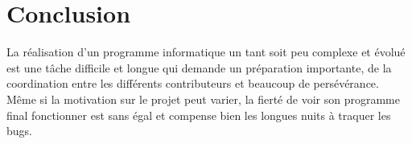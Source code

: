 \section{Conclusion}
La réalisation d'un programme informatique un tant soit peu complexe
et évolué est une tâche difficile et longue qui demande un préparation importante,
de la coordination entre les différents contributeurs et beaucoup de
persévérance. Même si la motivation sur le projet peut varier, la fierté
de voir son programme final fonctionner est sans égal et compense bien
les longues nuits à traquer les bugs.
\nocite{*}


